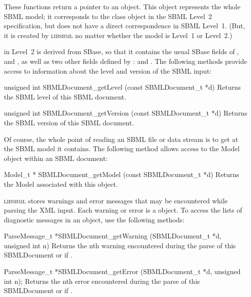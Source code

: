 \documentclass{sbmlmanual}
\newcommand{\libsbml}{\textsc{libsbml}}
\begin{document}
These functions return a pointer to an  object.
This object represents the whole SBML model; it corresponds to the
 class object in the SBML Level~2 specification, but does not
have a direct correspondence in SBML Level~1.  (But, it is created by
\libsbml{} no matter whether the model is Level~1 or Level~2.)

 in Level~2 is derived from SBase, so that it
contains the usual SBase fields of ,  and
, as well as two other fields defined by :
 and .  The following methods provide access
to information about the level and version of the SBML input:


\begin{methoddef}{unsigned int SBMLDocument\_getLevel (const SBMLDocument\_t *d)}
  Returns the SBML level of this SBML document.
\end{methoddef}


\begin{methoddef}{unsigned int SBMLDocument\_getVersion (const SBMLDocument\_t *d)}
  Returns the SBML version of this SBML document.
\end{methoddef}


Of course, the whole point of reading an SBML file or data stream is to get
at the SBML model it contains.  The following method allows access to the
Model object within an SBML document:


\begin{methoddef}{Model\_t * SBMLDocument\_getModel (const SBMLDocument\_t *d)}
  Returns the Model associated with this  object.
\end{methoddef}


\libsbml{} stores warnings and error messages that may be encountered while
parsing the XML input.  Each warning or error is a 
object.  To access the lists of diagnostic messages in an
 object, use the following methods:


\begin{methoddef}{ParseMessage\_t *SBMLDocument\_getWarning
(SBMLDocument\_t *d, unsigned int n)}
   Returns the nth warning encountered during the parse of this
   SBMLDocument or  if .
 \end{methoddef}

\begin{methoddef}{ParseMessage\_t *SBMLDocument\_getError (SBMLDocument\_t *d,
unsigned int n);}
   Returns the nth error encountered during the parse of this
   SBMLDocument or  if .
 \end{methoddef}
\end{document}
